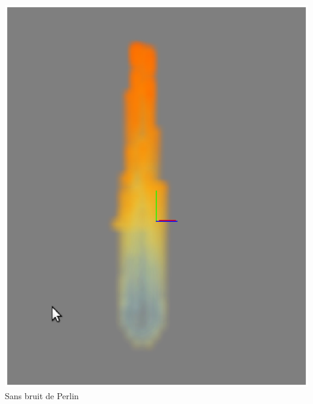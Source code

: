 \documentclass[a4paper,10pt]{article}
\begin{document}
\begin{center}
\includegraphics[scale=0.5]{SansPerlin.ps}\\
Sans bruit de Perlin
\end{center}
\end{document}
